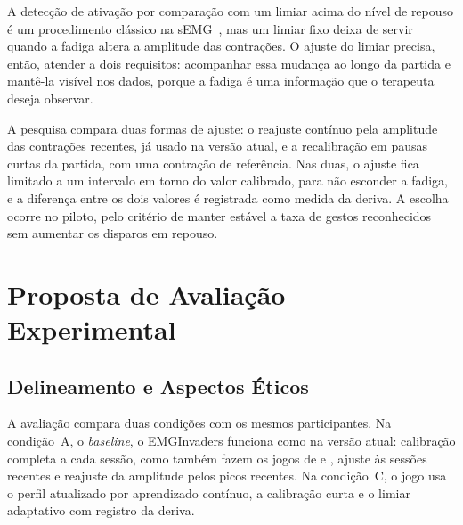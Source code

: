 \documentclass[runningheads]{llncs}
\begin{document}
A detecção de ativação por comparação com um limiar acima do nível de repouso é um procedimento clássico na sEMG~\citep{hodges1996onset}, mas um limiar fixo deixa de servir quando a fadiga altera a amplitude das contrações. O ajuste do limiar precisa, então, atender a dois requisitos: acompanhar essa mudança ao longo da partida e mantê-la visível nos dados, porque a fadiga é uma informação que o terapeuta deseja observar.

A pesquisa compara duas formas de ajuste: o reajuste contínuo pela amplitude das contrações recentes, já usado na versão atual, e a recalibração em pausas curtas da partida, com uma contração de referência. Nas duas, o ajuste fica limitado a um intervalo em torno do valor calibrado, para não esconder a fadiga, e a diferença entre os dois valores é registrada como medida da deriva. A escolha ocorre no piloto, pelo critério de manter estável a taxa de gestos reconhecidos sem aumentar os disparos em repouso.

\section{Proposta de Avaliação Experimental}\label{sec:avaliacao}

\subsection{Delineamento e Aspectos Éticos}

A avaliação compara duas condições com os mesmos participantes. Na condição~A, o \textit{baseline}, o EMGInvaders funciona como na versão atual: calibração completa a cada sessão, como também fazem os jogos de \citet{seo2022emg} e \citet{boulay2024serious}, ajuste às sessões recentes e reajuste da amplitude pelos picos recentes. Na condição~C, o jogo usa o perfil atualizado por aprendizado contínuo, a calibração curta e o limiar adaptativo com registro da deriva.
\end{document}
